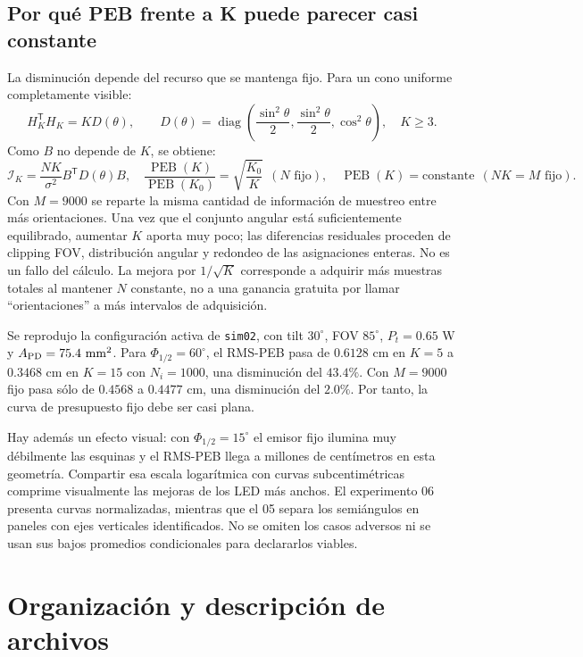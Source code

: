 \documentclass[11pt,a4paper]{article}
\newcommand{\PEB}{\operatorname{PEB}}
\begin{document}
\subsection{Por qué PEB frente a K puede parecer casi constante}
La disminución depende del recurso que se mantenga fijo. Para un cono uniforme completamente visible:
\begin{equation}
H_K^{\mathsf T}H_K=K D(\theta),\qquad
D(\theta)=\operatorname{diag}\left(\frac{\sin^2\theta}{2},\frac{\sin^2\theta}{2},\cos^2\theta\right),\quad K\geq3.
\end{equation}
Como $B$ no depende de $K$, se obtiene:
\begin{equation}
\mathcal I_K=\frac{NK}{\sigma^2}B^{\mathsf T}D(\theta)B,
\quad
\frac{\PEB(K)}{\PEB(K_0)}=\sqrt{\frac{K_0}{K}}\ \ (N\text{ fijo}),
\quad
\PEB(K)=\text{constante}\ \ (NK=M\text{ fijo}).
\label{eq:K_plateau}
\end{equation}
Con $M=9000$ se reparte la misma cantidad de información de muestreo entre más orientaciones. Una vez que el conjunto angular está suficientemente equilibrado, aumentar $K$ aporta muy poco; las diferencias residuales proceden de clipping FOV, distribución angular y redondeo de las asignaciones enteras. No es un fallo del cálculo. La mejora por $1/\sqrt K$ corresponde a adquirir más muestras totales al mantener $N$ constante, no a una ganancia gratuita por llamar ``orientaciones'' a más intervalos de adquisición.

Se reprodujo la configuración activa de \texttt{sim02}, con tilt $30^\circ$, FOV $85^\circ$, $P_t=0.65$ W y $A_{\rm PD}=75.4\ \mathrm{mm}^2$. Para $\Phi_{1/2}=60^\circ$, el RMS-PEB pasa de $0.6128$ cm en $K=5$ a $0.3468$ cm en $K=15$ con $N_i=1000$, una disminución del $43.4\%$. Con $M=9000$ fijo pasa sólo de $0.4568$ a $0.4477$ cm, una disminución del $2.0\%$. Por tanto, la curva de presupuesto fijo debe ser casi plana.

Hay además un efecto visual: con $\Phi_{1/2}=15^\circ$ el emisor fijo ilumina muy débilmente las esquinas y el RMS-PEB llega a millones de centímetros en esta geometría. Compartir esa escala logarítmica con curvas subcentimétricas comprime visualmente las mejoras de los LED más anchos. El experimento 06 presenta curvas normalizadas, mientras que el 05 separa los semiángulos en paneles con ejes verticales identificados. No se omiten los casos adversos ni se usan sus bajos promedios condicionales para declararlos viables.

\section{Organización y descripción de archivos}
\end{document}
